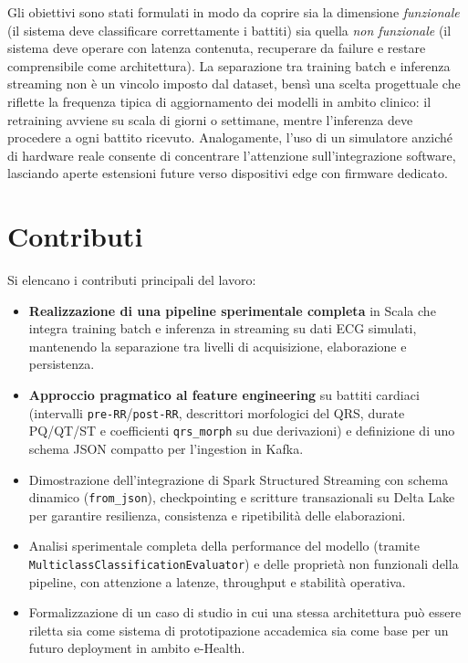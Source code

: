 Gli obiettivi sono stati formulati in modo da coprire sia la dimensione \emph{funzionale} (il sistema deve classificare correttamente i battiti) sia quella \emph{non funzionale} (il sistema deve operare con latenza contenuta, recuperare da failure e restare comprensibile come architettura).
La separazione tra training batch e inferenza streaming non è un vincolo imposto dal dataset, bensì una scelta progettuale che riflette la frequenza tipica di aggiornamento dei modelli in ambito clinico: il retraining avviene su scala di giorni o settimane, mentre l'inferenza deve procedere a ogni battito ricevuto.
Analogamente, l'uso di un simulatore anziché di hardware reale consente di concentrare l'attenzione sull'integrazione software, lasciando aperte estensioni future verso dispositivi edge con firmware dedicato.

\section{Contributi}\label{sec:contributi}
Si elencano i contributi principali del lavoro:
\begin{itemize}
  \item \textbf{Realizzazione di una pipeline sperimentale completa} in Scala che integra training batch e inferenza in streaming su dati ECG simulati, mantenendo la separazione tra livelli di acquisizione, elaborazione e persistenza.
  \item \textbf{Approccio pragmatico al feature engineering} su battiti cardiaci (intervalli \texttt{pre-RR}/\texttt{post-RR}, descrittori morfologici del QRS, durate PQ/QT/ST e coefficienti \texttt{qrs\_morph} su due derivazioni) e definizione di uno schema JSON compatto per l'ingestion in Kafka.
  \item Dimostrazione dell'integrazione di Spark Structured Streaming con schema dinamico (\texttt{from\_json}), checkpointing e scritture transazionali su Delta Lake per garantire resilienza, consistenza e ripetibilità delle elaborazioni.
  \item Analisi sperimentale completa della performance del modello (tramite \texttt{MulticlassClassificationEvaluator}) e delle proprietà non funzionali della pipeline, con attenzione a latenze, throughput e stabilità operativa.
  \item Formalizzazione di un caso di studio in cui una stessa architettura può essere riletta sia come sistema di prototipazione accademica sia come base per un futuro deployment in ambito e-Health.
\end{itemize}

